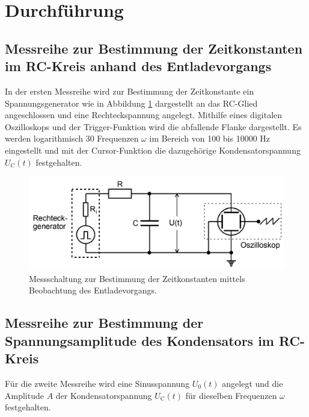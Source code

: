 \section{Durchführung}
\label{sec:Durchführung}

\subsection{Messreihe zur Bestimmung der Zeitkonstanten im RC-Kreis anhand des Entladevorgangs}

In der ersten Messreihe wird zur Bestimmung der Zeitkonstante ein Spannungsgenerator
wie in Abbildung \ref{fig:v353_1} dargestellt an das RC-Glied angeschlossen und eine Rechteckspannung angelegt.
Mithilfe eines digitalen Oszilloskops und der Trigger-Funktion wird die abfallende 
Flanke dargestellt. Es werden logarithmisch 30 Frequenzen $\omega$ im Bereich von 100 bis 10000
$\si{\hertz}$ eingestellt und mit der Cursor-Funktion die dazugehörige Kondensatorspannung 
$U_\text{C}(t)$ festgehalten.
\begin{figure}[H]
  \centering
  \includegraphics{V353_1.png}
  \caption{Messschaltung zur Bestimmung der Zeitkonstanten mittels Beobachtung des 
  Entladevorgangs. \cite[S. 6]{kent}}
  \label{fig:v353_1}
\end{figure}

\subsection{Messreihe zur Bestimmung der Spannungsamplitude des Kondensators
im RC-Kreis}
Für die zweite Messreihe wird eine Sinusspannung $U_\text{0}(t)$ angelegt und die 
Amplitude $A$ der Kondensatorspannung $U_\text{C}(t)$ für dieselben Frequenzen $\omega$ festgehalten.

